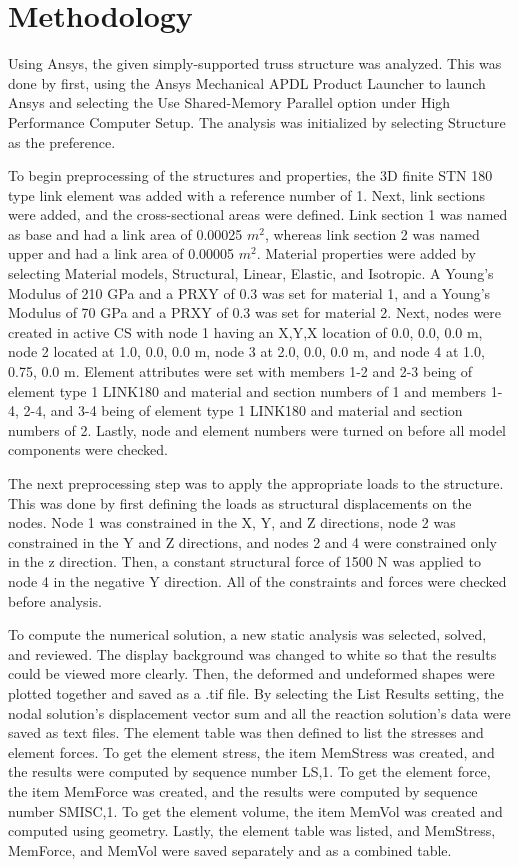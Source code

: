\chapter{Methodology}\label{cp:methodology}

Using Ansys, the given simply-supported truss structure was analyzed. This was done by first, using the Ansys Mechanical APDL Product Launcher to launch Ansys and selecting the Use Shared-Memory Parallel option under High Performance Computer Setup. The analysis was initialized by selecting Structure as the preference. 

To begin preprocessing of the structures and properties, the 3D finite STN 180 type link element was added with a reference number of 1. Next, link sections were added, and the cross-sectional areas were defined. Link section 1 was named as base and had a link area of 0.00025 $m^{2}$, whereas link section 2 was named upper and had a link area of 0.00005 $m^{2}$. Material properties were added by selecting Material models, Structural, Linear, Elastic, and Isotropic. A Young's Modulus of 210 GPa and a PRXY of 0.3 was set for material 1, and a Young's Modulus of 70 GPa and a PRXY of 0.3 was set for material 2. Next, nodes were created in active CS with node 1 having an X,Y,X location of 0.0, 0.0, 0.0 m, node 2 located at 1.0, 0.0, 0.0 m, node 3 at 2.0, 0.0, 0.0 m, and node 4 at 1.0, 0.75, 0.0 m. Element attributes were set with members 1-2 and 2-3 being of element type 1 LINK180 and material and section numbers of 1 and members 1-4, 2-4, and 3-4 being of element type 1 LINK180 and material and section numbers of 2. Lastly, node and element numbers were turned on before all model components were checked. 

The next preprocessing step was to apply the appropriate loads to the structure. This was done by first defining the loads as structural displacements on the nodes. Node 1 was constrained in the X, Y, and Z directions, node 2 was constrained in the Y and Z directions, and nodes 2 and 4 were constrained only in the z direction. Then, a constant structural force of 1500 N was applied to node 4 in the negative Y direction. All of the constraints and forces were checked before analysis. 

To compute the numerical solution, a new static analysis was selected, solved, and reviewed. The display background was changed to white so that the results could be viewed more clearly. Then, the deformed and undeformed shapes were plotted together and saved as a .tif file. By selecting the List Results setting, the nodal solution's displacement vector sum and all the reaction solution's data were saved as text files. The element table was then defined to list the stresses and element forces. To get the element stress, the item MemStress was created, and the results were computed by sequence number LS,1. To get the element force, the item MemForce was created, and the results were computed by sequence number SMISC,1. To get the element volume, the item MemVol was created and computed using geometry. Lastly, the element table was listed, and MemStress, MemForce, and MemVol were saved separately and as a combined table.